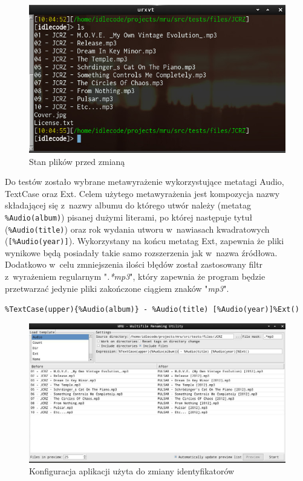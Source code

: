 \begin{figure}[h]
\begin{center}
\includegraphics[scale=0.70]{img/test_before.png}
\end{center}
\caption{Stan plików przed zmianą}
\label{test-before}
\end{figure}

\par
Do testów zostało wybrane metawyrażenie wykorzystujące metatagi Audio, TextCase oraz Ext.
Celem użytego metawyrażenia jest kompozycja nazwy składającej się z~nazwy albumu do którego utwór należy (metatag \texttt{\%Audio(album)}) pisanej dużymi literami, po której następuje tytuł (\texttt{\%Audio(title)}) oraz rok wydania utworu w~nawiasach kwadratowych (\texttt{[\%Audio(year)]}). Wykorzystany na końcu metatag Ext, zapewnia że pliki wynikowe będą posiadały takie samo rozszerzenia jak w~nazwa źródłowa.\\
Dodatkowo w~celu zmniejszenia ilości błędów został zastosowany filtr z~wyrażeniem regularnym "\textit{.*mp3}", który zapewnia że program będzie przetwarzać jedynie pliki zakończone ciągiem znaków "\textit{mp3}".

\begin{center}
\texttt{\%TextCase(upper)\{\%Audio(album)\} - \%Audio(title) [\%Audio(year)]\%Ext()}
\end{center}

\begin{figure}[h]
\begin{center}
\includegraphics[scale=0.45]{img/test_window.png}
\end{center}
\caption{Konfiguracja aplikacji użyta do zmiany identyfikatorów}
\end{figure}


